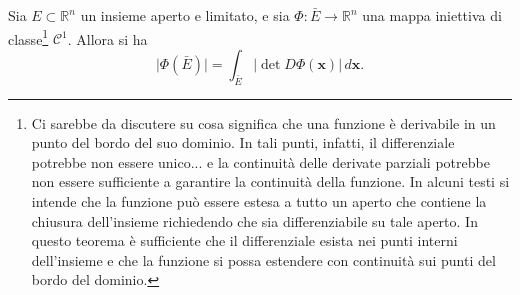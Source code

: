 \documentclass[italian,a4paper]{scrartcl}
\newcommand{\RR}{{\mathbb R}}
\renewcommand{\vec}{\mathbf}
\begin{document}
\begin{theorem}
Sia $E\subset \RR^n$ un insieme aperto e limitato, e sia $\Phi\colon
\bar E \to \RR^n$ una mappa iniettiva di classe\footnote{Ci sarebbe da
discutere su cosa significa che una funzione è derivabile in un
punto del bordo del suo dominio. In tali punti, infatti, il
differenziale potrebbe non essere unico... e la continuità delle
derivate parziali potrebbe non essere sufficiente a garantire la
continuità della funzione. In alcuni testi si intende
che la funzione può essere estesa a tutto un aperto che contiene la
chiusura dell'insieme richiedendo che sia differenziabile su tale
aperto. In questo teorema è sufficiente che il differenziale esista
nei punti interni dell'insieme e che la funzione si possa estendere
con continuità sui punti del bordo del dominio.} $\mathcal C^1$.
Allora si ha
\[
 \lvert \Phi(\bar E) \rvert = \int_{\bar E} \lvert \det D\Phi(\vec x)\rvert\,
 d\vec x.
\]
\end{theorem}
\end{document}
